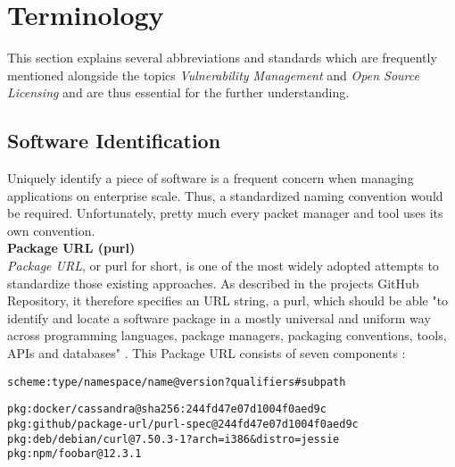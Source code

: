 
\section{Terminology}
This section explains several abbreviations and standards which are frequently mentioned alongside the topics \textit{Vulnerability Management} and \textit{Open Source Licensing} and are thus essential for the further understanding.\\

\subsection{Software Identification}
Uniquely identify a piece of software is a frequent concern when managing applications on enterprise scale. Thus, a standardized naming convention would be required. Unfortunately, pretty much every packet manager and tool uses its own convention.\\

\noindent
\textbf{Package URL (purl)}\\
\noindent
\textit{Package URL}, or purl for short, is one of the most widely adopted attempts to standardize those existing approaches. As described in the projects GitHub Repository, it therefore specifies an URL string, a purl, which should be able "to identify and locate a software package in a mostly universal and uniform way across programming languages, package managers, packaging conventions, tools, APIs and databases" \cite{purl}. This Package URL consists of seven components \cite{purl}:\\

\begin{lstlisting}[caption=Package URL, captionpos=b, label=lst:Purl]
scheme:type/namespace/name@version?qualifiers#subpath
\end{lstlisting}

\begin{lstlisting}[caption=Package URL Examples, captionpos=b, label=lst:Purl]
pkg:docker/cassandra@sha256:244fd47e07d1004f0aed9c
pkg:github/package-url/purl-spec@244fd47e07d1004f0aed9c
pkg:deb/debian/curl@7.50.3-1?arch=i386&distro=jessie
pkg:npm/foobar@12.3.1
\end{lstlisting}

